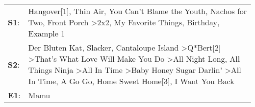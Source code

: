 \begin{supertabular}{p{0.03\textwidth}p{0.92\textwidth}}
 \textbf{S1}:  &                                                                                                                                                                                                                                                                           Hangover[1]\textsuperscript{}, \enspace Thin Air\textsuperscript{}, \enspace You Can't Blame the Youth\textsuperscript{}, \enspace Nachos for Two\textsuperscript{}, \enspace Front Porch\textsuperscript{} \textgreater \enspace 2x2\textsuperscript{}, \enspace My Favorite Things\textsuperscript{}, \enspace Birthday\textsuperscript{}, \enspace Example 1\textsuperscript{}  \enspace  \\
 \textbf{S2}:  &  Der Bluten Kat\textsuperscript{}, \enspace Slacker\textsuperscript{}, \enspace Cantaloupe Island\textsuperscript{} \textgreater \enspace Q*Bert[2]\textsuperscript{} \textgreater \enspace That's What Love Will Make You Do\textsuperscript{} \textgreater \enspace All Night Long\textsuperscript{}, \enspace All Things Ninja\textsuperscript{} \textgreater \enspace All In Time\textsuperscript{} \textgreater \enspace Baby Honey Sugar Darlin'\textsuperscript{} \textgreater \enspace All In Time\textsuperscript{}, \enspace A Go Go\textsuperscript{}, \enspace Home Sweet Home[3]\textsuperscript{}, \enspace I Want You Back\textsuperscript{}  \enspace  \\
 \textbf{E1}:  &                                                                                                                                                                                                                                                                                                                                                                                                                                                                                                                                                                                                                                      Mamu\textsuperscript{}  \enspace  \\
\end{supertabular}
